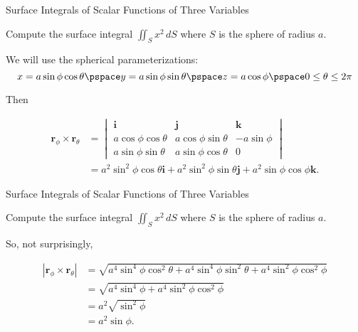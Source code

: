 \documentclass[11pt,english,
handout
]{beamer}
\begin{document}
\begin{frame}[t]{Surface Integrals of Scalar Functions of Three Variables}
\small
\begin{example}
Compute the surface integral $\iint_Sx^2\,dS$ where $S$ is the sphere of radius $a$.\pause 

\lspace
We will use the spherical parameterizations:
\[
x=a\sin\phi\cos\theta\pspace y=a\sin\phi\sin\theta\pspace z=a\cos\phi\pspace0\leq \theta\leq 2\pi
\]\pause

Then

\begin{align*}
\mathbf{r}_\phi\times\mathbf{r}_\theta&=\begin{vmatrix}\mathbf{i}&\mathbf{j}&\mathbf{k}\\[2mm] a\cos\phi\cos\theta & a\cos\phi\sin\theta & -a\sin\phi\\[2mm] a\sin\phi\sin\theta & a\sin\phi\cos\theta & 0\end{vmatrix}\\[2mm]
&=a^2\sin^2\phi\cos\theta\mathbf{i}+a^2\sin^2\phi\sin\theta\mathbf{j} +a^2\sin\phi\cos\phi\mathbf{k}.
\end{align*}
\end{example}
\end{frame}











\begin{frame}[t]{Surface Integrals of Scalar Functions of Three Variables}
\small
\begin{example}
Compute the surface integral $\iint_Sx^2\,dS$ where $S$ is the sphere of radius $a$.

\lspace
So, not surprisingly,

\begin{align*}
|\mathbf{r}_\phi\times\mathbf{r}_\theta|&=\sqrt{a^4\sin^4\phi\cos^2\theta+a^4\sin^4\phi\sin^2\theta+a^4\sin^2\phi\cos^2\phi}\\[2mm]
&=\sqrt{a^4\sin^4\phi+a^4\sin^2\phi\cos^2\phi}\\[2mm]
&=a^2\sqrt{\sin^2\phi}\\[2mm]
&=a^2\sin\phi.
\end{align*}
\end{example}
\end{frame}
\end{document}
